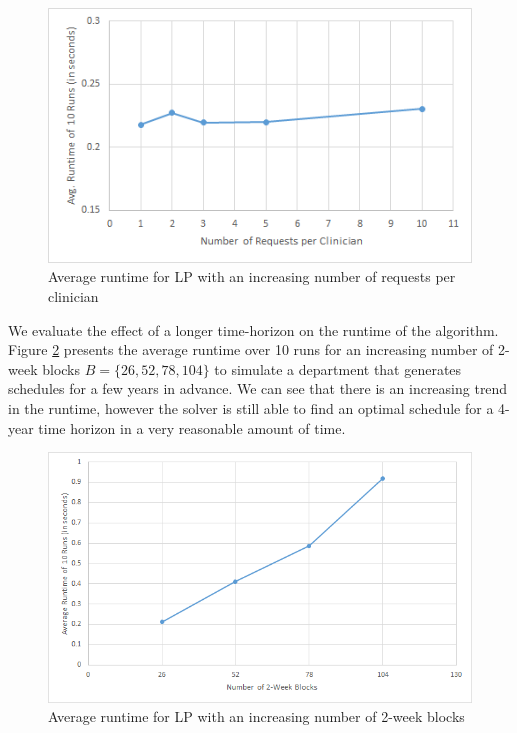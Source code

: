 \begin{figure}[h]
	\centering
	\includegraphics[scale=.7]{fig/avg_runtime_requests}
	\caption{Average runtime for LP with an increasing number of requests per clinician}
	\label{fig:avg-runtime-requests}
\end{figure}

We evaluate the effect of a longer time-horizon on the runtime of the algorithm. Figure \ref{fig:avg-runtime-blocks} presents the average runtime over 10 runs for an increasing number of 2-week blocks $B = \{26, 52, 78, 104\}$ to simulate a department that generates schedules for a few years in advance. We can see that there is an increasing trend in the runtime, however the solver is still able to find an optimal schedule for a 4-year time horizon in a very reasonable amount of time. \\

\begin{figure}[h]
	\centering
	\includegraphics[scale=.7]{fig/avg_runtime_blocks}
	\caption{Average runtime for LP with an increasing number of 2-week blocks}
	\label{fig:avg-runtime-blocks}
\end{figure}

